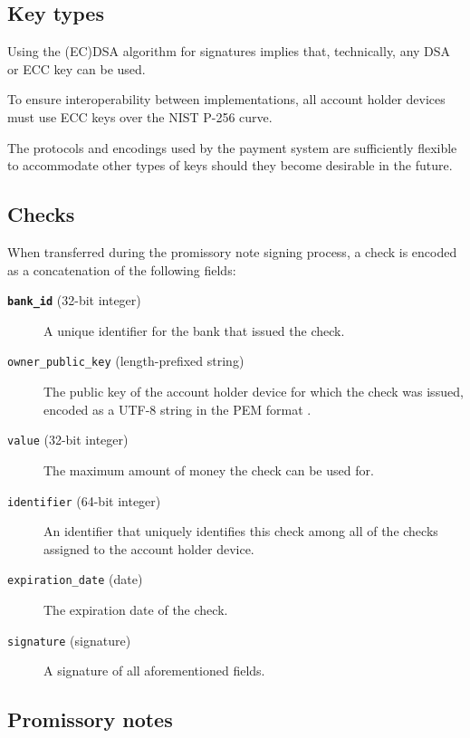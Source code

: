 \documentclass[12pt,a4paper]{article}
\begin{document}
\begin{multicols}{2}
	\subsection{Key types}
	\label{sec:key-types}

	Using the (EC)DSA algorithm for signatures implies that, technically, any DSA or ECC key can be used.
	
	To ensure interoperability between implementations, all account holder devices must use ECC keys over the NIST P-256 curve.

	The protocols and encodings used by the payment system are sufficiently flexible to accommodate other types of keys should they become desirable in the future.

	\subsection{Checks}
	
	When transferred during the promissory note signing process, a check is encoded as a concatenation of the following fields:
	
	\begin{description}
		\item[\textbf{\texttt{bank\_id}} (32-bit integer)] A unique identifier for the bank that issued the check.

		\item[\texttt{owner\_public\_key} (length-prefixed string)] The public key of the account holder device for which the check was issued, encoded as a UTF-8 string in the PEM format \cite{rfc-pem}.

		\item[\texttt{value} (32-bit  integer)] The maximum amount of money the check can be used for.

		\item[\texttt{identifier} (64-bit integer)] An identifier that uniquely identifies this check among all of the checks assigned to the account holder device.
		
		\item[\texttt{expiration\_date} (date)] The expiration date of the check.

		\item[\texttt{signature} (signature)] A signature of all aforementioned fields.
	\end{description}

	\subsection{Promissory notes}
 

\end{multicols}
\end{document}
